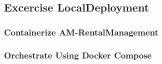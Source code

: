 \subsection{Excercise LocalDeployment}
\subsubsection*{Containerize AM-RentalManagement}

\subsubsection*{Orchestrate Using Docker Compose}